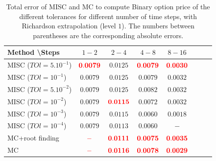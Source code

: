 \documentclass[11pt]{article}
\begin{document}
\begin{table}[h!]
	\centering
	\begin{tabular}{l*{6}{c}r}
		Method \textbackslash  Steps            & $1-2$ & $2-4$ & $4-8$ & $8-16$  \\
		\hline
		MISC ($TOl=5.10^{-1}$)  &  $\mathbf{{\color{red}0.0079}}$ & $\mathbf{0.0125}$ & $\mathbf{{\color{red}0.0079}}$ & $\mathbf{{\color{red}0.0030}}$  \\
		MISC ($TOl=10^{-1}$)  &   $\mathbf{0.0079}$& $\mathbf{0.0125}$ & $\mathbf{0.0079}$ & $\mathbf{0.0032}$  \\
		MISC ($TOl=5.10^{-2}$) &   $\mathbf{0.0079}$ & $\mathbf{0.0125}$ & $\mathbf{0.0082}$ & $\mathbf{0.0032}$  \\
		MISC ($TOl=10^{-2}$)  &   $\mathbf{0.0079}$ & $\mathbf{{\color{red}0.0115}}$ & $\mathbf{0.0072}$ & $\mathbf{0.0032}$  \\
		MISC ($TOl=10^{-3}$) &   $\mathbf{0.0079}$ & $\mathbf{0.0115}$ & $\mathbf{0.0060}$ & $\mathbf{0.0018}$  \\

	MISC ($TOl=10^{-4}$) &   $\mathbf{0.0079}$ & $\mathbf{0.0113}$ & $\mathbf{0.0060}$ & $\mathbf{-}$  \\
		\hline
		MC+root finding   &  $\mathbf{{\color{red}-}}$ & $\mathbf{{\color{red}0.0111}}$ & $\mathbf{{\color{red}0.0075}}$ & $\mathbf{{\color{red}0.0035}}$  \\	
			MC    &  $\mathbf{{\color{red}-}}$ & $\mathbf{{\color{red}0.0116}}$ & $\mathbf{{\color{red}0.0078}}$ & $\mathbf{{\color{red}0.0029}}$  \\	
		\hline
	\end{tabular}
	\caption{Total error of MISC and MC to compute Binary option price of the different tolerances for different number of time steps, with Richardson extrapolation (level $1$). The numbers between parentheses are the corresponding absolute errors.}
	\label{Total error of MISC and MC to compute Binary option price of the different tolerances for different number of time steps, with Richardson extrapolation (level $1$). The numbers between parentheses are the corresponding absolute errors.}
\end{table}
\end{document}
